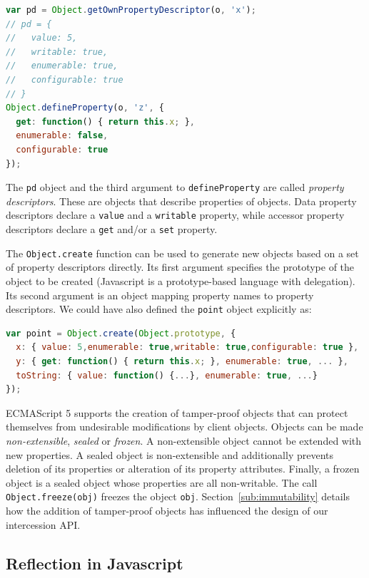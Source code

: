 \documentclass{sig-alternate}
\begin{document}
\begin{lstlisting}[language=javascript]
var pd = Object.getOwnPropertyDescriptor(o, 'x');
// pd = {
//   value: 5,
//   writable: true,
//   enumerable: true,
//   configurable: true 
// }
Object.defineProperty(o, 'z', {
  get: function() { return this.x; },
  enumerable: false,
  configurable: true
});
\end{lstlisting}

The \texttt{pd} object and the third argument to \texttt{defineProperty} are called \emph{property descriptors}. These are objects that describe properties of objects. Data property descriptors declare a \texttt{value} and a \texttt{writable} property, while accessor property descriptors declare a \texttt{get} and/or a \texttt{set} property.

The \texttt{Object.create} function can be used to generate new objects based on a set of property descriptors directly. Its first argument specifies the prototype of the object to be created (Javascript is a prototype-based language with delegation). Its second argument is an object mapping property names to property descriptors. We could have also defined the \texttt{point} object explicitly as:

\begin{lstlisting}[language=javascript]
var point = Object.create(Object.prototype, {
  x: { value: 5,enumerable: true,writable: true,configurable: true },
  y: { get: function() { return this.x; }, enumerable: true, ... },
  toString: { value: function() {...}, enumerable: true, ...}
});
\end{lstlisting}

ECMAScript 5 supports the creation of tamper-proof objects that can protect themselves from undesirable modifications by client objects. Objects can be made \emph{non-extensible}, \emph{sealed} or \emph{frozen}. A non-extensible object cannot be extended with new properties. A sealed object is non-extensible and additionally prevents deletion of its properties or alteration of its property attributes. Finally, a frozen object is a sealed object whose properties are all non-writable. The call \texttt{Object.freeze(obj)} freezes the object \texttt{obj}. Section~\ref{sub:immutability} details how the addition of tamper-proof objects has influenced the design of our intercession API.

\subsection{Reflection in Javascript}
\label{sub:introspection_in_js}
\end{document}
